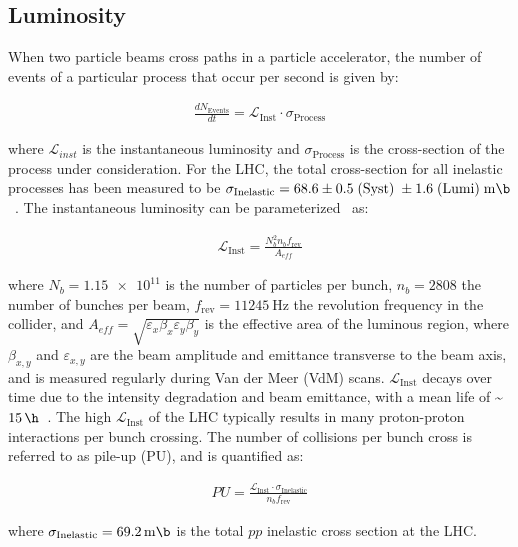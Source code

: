 \subsection{Luminosity}
When two particle beams cross paths in a particle accelerator, the number of events of a particular process that occur per second is given by:
\begin{linenomath*}
\begin{align}
{\frac{dN_{\text {Events}}}{dt}}= \mathcal{L}_{\text{Inst}} \cdot \sigma_{\text{Process}}
\end{align}
\end{linenomath*}
where $\mathcal{L}_{inst}$ is the instantaneous luminosity and $\sigma_{\text{Process}}$ is the cross-section of the process under consideration.
For the \beamenergy LHC, the total cross-section for all inelastic processes has been measured to be $\sigma_{\text{Inelastic}} = 68.6 \pm 0.5 \; (\text{Syst}) \; \pm 1.6 \; (\text{Lumi}) \; \si{\milli \b}$~\cite{inelasticprotonprotoncrosssection}.
The instantaneous luminosity can be parameterized~\cite{Karacheban:2294183} as:
\begin{linenomath*}
\begin{align}
\mathcal{L}_{\text{Inst}}=\frac{N_b^2 n_b f_{\mathrm{rev}}}{A_{eff}}
\end{align}
\end{linenomath*}
where $N_b = \num{1.15e11}$ is the number of particles per bunch, $n_b=2808$ the number of bunches per beam, $f_{\mathrm{rev}} = \SI{11245}{\Hz}$ the revolution frequency in the collider, and $A_{eff} = \sqrt{\varepsilon_x \beta_x \varepsilon_y \beta_y}$ is the effective area of the luminous region, where $\beta_{x,y}$ and $\varepsilon_{x,y}$ are the beam amplitude and emittance transverse to the beam axis, and is measured regularly during Van der Meer (VdM) scans.
$\mathcal{L}_{\text{Inst}}$ decays over time due to the intensity degradation and beam emittance, with a mean life of \sim$\SI{15}{\h}$~\cite{LyndonEvans_2008}.
The high $\mathcal{L}_{\text{Inst}}$ of the LHC typically results in many proton-proton interactions per bunch crossing.
The number of collisions per bunch cross is referred to as pile-up (PU), and is quantified as:
\begin{linenomath*}
\begin{align}
PU = \frac{\mathcal{L}_{\text{Inst}} \cdot \sigma_{\text{Inelastic}}}{n_b f_{\mathrm{rev}}}
\end{align}
\end{linenomath*}
where $\sigma_{\text{Inelastic}} = \SI{69.2}{\milli \b}$ is the total $pp$ inelastic cross section at the \beamenergy LHC.
